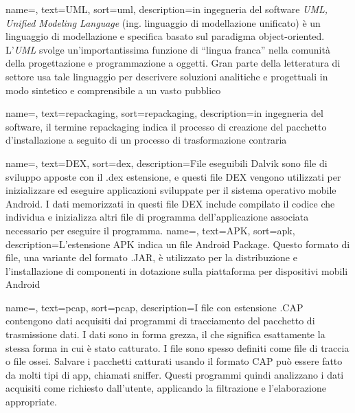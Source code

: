 {
    name=,
    text=UML,
    sort=uml,
    description={in ingegneria del software \emph{UML, Unified Modeling Language} (ing. linguaggio di modellazione unificato) è un linguaggio di modellazione e specifica basato sul paradigma object-oriented. L'\emph{UML} svolge un'importantissima funzione di ``lingua franca'' nella comunità della progettazione e programmazione a oggetti. Gran parte della letteratura di settore usa tale linguaggio per descrivere soluzioni analitiche e progettuali in modo sintetico e comprensibile a un vasto pubblico}
}

{
    name=,
    text=repackaging,
    sort=repackaging,
    description={in ingegneria del software, il termine repackaging indica il processo di creazione del pacchetto d'installazione a seguito di un processo di trasformazione contraria}
}

{
    name=,
    text=DEX,
    sort=dex,
    description={File eseguibili Dalvik sono file di sviluppo apposte con il .dex estensione, e questi file DEX vengono utilizzati per inizializzare ed eseguire applicazioni sviluppate per il sistema operativo mobile Android.
    I dati memorizzati in questi file DEX include compilato il codice che individua e inizializza altri file di programma dell'applicazione associata necessario per eseguire il programma.}
}
{
    name=,
    text=APK,
    sort=apk,
    description={L'estensione APK indica un file Android Package. Questo formato di file, una variante del formato .JAR, è utilizzato per la distribuzione e l'installazione di componenti in dotazione sulla piattaforma per dispositivi mobili Android}
}

{
    name=,
    text=pcap,
    sort=pcap,
    description={I file con estensione .CAP contengono dati acquisiti dai programmi di tracciamento del pacchetto di trasmissione dati. I dati sono in forma grezza, il che significa esattamente la stessa forma in cui è stato catturato.
    I file sono spesso definiti come file di traccia o file ossei. Salvare i pacchetti catturati usando il formato CAP può essere fatto da molti tipi di app, chiamati sniffer. Questi programmi quindi analizzano i dati acquisiti come richiesto dall'utente, applicando la filtrazione e l'elaborazione appropriate.}
}

